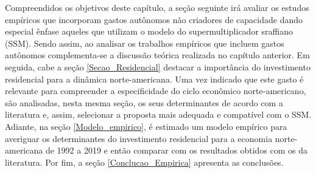 Compreendidos os objetivos deste capítulo, a seção seguinte irá avaliar os estudos empíricos que incorporam gastos autônomos não criadores de capacidade dando especial ênfase aqueles que utilizam o modelo do supermultiplicador sraffiano (SSM). Sendo assim, ao analisar os trabalhos empíricos que incluem gastos autônomos complementa-se a discussão teórica realizada no capítulo anterior. 
Em seguida, cabe a seção \ref{Secao_Residencial} destacar a importância do investimento residencial para a dinâmica norte-americana. 
Uma vez indicado que este gasto é relevante para compreender a especificidade do ciclo econômico norte-americano, são analisadas, nesta mesma seção, os seus determinantes de acordo com a literatura e, assim, selecionar a proposta mais adequada e compatível com o SSM.
Adiante, na seção \ref{Modelo_empirico}, é estimado um modelo empírico para averiguar os determinantes do investimento residencial para a economia norte-americana de 1992 a 2019 e então comparar com os resultados obtidos com os da literatura. Por fim, a seção \ref{Conclucao_Empirica} apresenta as conclusões.